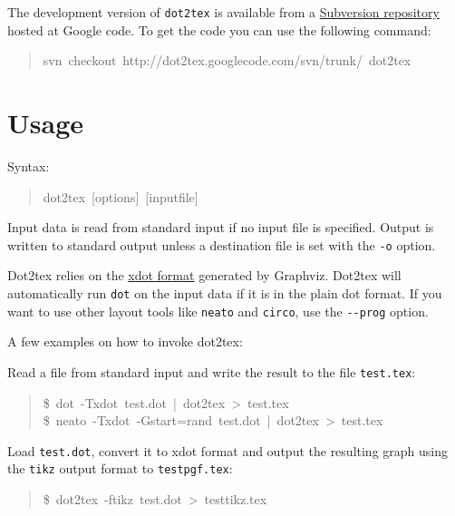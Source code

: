 \documentclass[10pt,a4paper,english]{article}
\begin{document}
The development version of \texttt{dot2tex} is  available from a \href{http://code.google.com/p/dot2tex/source}{Subversion repository} hosted at Google code. To get the code you can use the following command:
\begin{quote}{\ttfamily \raggedright \noindent
svn~checkout~http://dot2tex.googlecode.com/svn/trunk/~dot2tex
}\end{quote}



\hypertarget{usage}{}
\section*{Usage}
\label{usage}

Syntax:
\begin{quote}{\ttfamily \raggedright \noindent
dot2tex~{[}options{]}~{[}inputfile{]}
}\end{quote}

Input data is read from standard input if no input file is specified. Output is written to standard output unless a destination file is set with the \texttt{-o} option.

Dot2tex relies on the \href{http://www.graphviz.org/doc/info/output.html\#d:xdot}{xdot format} generated by Graphviz. Dot2tex will automatically run \texttt{dot} on the input data if it is in the plain dot format. If you want to use other layout tools like \texttt{neato} and \texttt{circo}, use the \texttt{-{}-prog} option.

A few examples on how to invoke dot2tex:

Read a file from standard input and write the result to the file \texttt{test.tex}:
\begin{quote}{\ttfamily \raggedright \noindent
{\$}~dot~-Txdot~test.dot~|~dot2tex~>~test.tex~\\
{\$}~neato~-Txdot~-Gstart=rand~test.dot~|~dot2tex~>~test.tex
}\end{quote}

Load \texttt{test.dot}, convert it to xdot format and output the resulting graph using the \texttt{tikz} output format to \texttt{testpgf.tex}:
\begin{quote}{\ttfamily \raggedright \noindent
{\$}~dot2tex~-ftikz~test.dot~>~testtikz.tex
}\end{quote}
\end{document}
